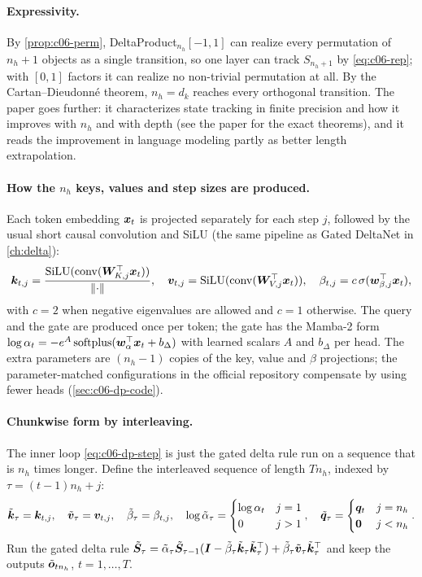\paragraph{Expressivity.}
By \cref{prop:c06-perm}, DeltaProduct$_{n_h}[-1,1]$ can realize every permutation of
$n_h+1$ objects as a single transition, so one layer can track $S_{n_h+1}$ by
\eqref{eq:c06-rep}; with $[0,1]$ factors it can realize no non-trivial permutation at all.
By the Cartan--Dieudonn\'e theorem, $n_h=d_k$ reaches every orthogonal transition. The
paper goes further: it characterizes state tracking in finite precision and how it improves
with $n_h$ and with depth (see the paper for the exact theorems), and it reads the
improvement in language modeling partly as better length extrapolation.

\paragraph{How the $n_h$ keys, values and step sizes are produced.}
Each token embedding $\bm{x}_t$ is projected separately for each step $j$, followed by the
usual short causal convolution and SiLU (the same pipeline as Gated DeltaNet in
\cref{ch:delta}):
\begin{equation}\label{eq:c06-dp-proj}
  \bm{k}_{t,j}=\frac{\operatorname{SiLU}(\mathrm{conv}(\bm{W}_{K,j}^{\top}\bm{x}_t))}{\left\lVert \cdot\right\rVert},\quad
  \bm{v}_{t,j}=\operatorname{SiLU}(\mathrm{conv}(\bm{W}_{V,j}^{\top}\bm{x}_t)),\quad
  \beta_{t,j}=c\,\sigma(\bm{w}_{\beta,j}^{\top}\bm{x}_t),
\end{equation}
with $c=2$ when negative eigenvalues are allowed and $c=1$ otherwise. The query and the gate
are produced once per token; the gate has the Mamba-2 form
$\log\alpha_t=-e^{A}\,\mathrm{softplus}(\bm{w}_\alpha^{\top}\bm{x}_t+b_{\Delta})$ with learned scalars
$A$ and $b_\Delta$ per head. The extra parameters are $(n_h-1)$ copies of the key, value and
$\beta$ projections; the parameter-matched configurations in the official repository
compensate by using fewer heads (\cref{sec:c06-dp-code}).

\paragraph{Chunkwise form by interleaving.}
The inner loop \eqref{eq:c06-dp-step} is just the gated delta rule run on a sequence that is
$n_h$ times longer. Define the interleaved sequence of length $Tn_h$, indexed by
$\tau=(t-1)n_h+j$:
\begin{equation}\label{eq:c06-interleave}
  \tilde{\bm{k}}_\tau=\bm{k}_{t,j},\quad \tilde{\bm{v}}_\tau=\bm{v}_{t,j},\quad
  \tilde\beta_\tau=\beta_{t,j},\quad
  \log\tilde\alpha_\tau=\begin{cases}\log\alpha_t & j=1\\ 0 & j>1\end{cases},\quad
  \tilde{\bm{q}}_\tau=\begin{cases}\bm{q}_t & j=n_h\\ \bm 0 & j<n_h\end{cases}.
\end{equation}
Run the gated delta rule
$\tilde{\bm{S}}_\tau=\tilde\alpha_\tau\tilde{\bm{S}}_{\tau-1}(\bm{I}-\tilde\beta_\tau\tilde{\bm{k}}_\tau\tilde{\bm{k}}_\tau^{\top})
+\tilde\beta_\tau\tilde{\bm{v}}_\tau\tilde{\bm{k}}_\tau^{\top}$ and keep the outputs
$\tilde{\bm{o}}_{tn_h}$, $t=1,\dots,T$.

